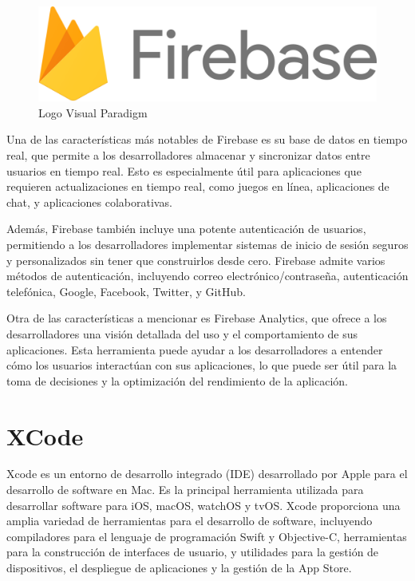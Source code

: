     \begin{figure}[H]
        \centering
        \includegraphics[width=.9\linewidth]{images/1280px-Firebase_Logo.svg.png}
        \caption{Logo Visual Paradigm}
        \label{fig:my_label}
    \end{figure}

    Una de las características más notables de Firebase es su base de datos en tiempo real, que permite a los desarrolladores almacenar y sincronizar datos entre usuarios en tiempo real. Esto es especialmente útil para aplicaciones que requieren actualizaciones en tiempo real, como juegos en línea, aplicaciones de chat, y aplicaciones colaborativas.

    Además, Firebase también incluye una potente autenticación de usuarios, permitiendo a los desarrolladores implementar sistemas de inicio de sesión seguros y personalizados sin tener que construirlos desde cero. Firebase admite varios métodos de autenticación, incluyendo correo electrónico/contraseña, autenticación telefónica, Google, Facebook, Twitter, y GitHub.

    Otra de las características a mencionar es Firebase Analytics, que ofrece a los desarrolladores una visión detallada del uso y el comportamiento de sus aplicaciones. Esta herramienta puede ayudar a los desarrolladores a entender cómo los usuarios interactúan con sus aplicaciones, lo que puede ser útil para la toma de decisiones y la optimización del rendimiento de la aplicación.
    
    \section{XCode}

    Xcode es un entorno de desarrollo integrado (IDE) desarrollado por Apple para el desarrollo de software en Mac. Es la principal herramienta utilizada para desarrollar software para iOS, macOS, watchOS y tvOS. Xcode proporciona una amplia variedad de herramientas para el desarrollo de software, incluyendo compiladores para el lenguaje de programación Swift y Objective-C, herramientas para la construcción de interfaces de usuario, y utilidades para la gestión de dispositivos, el despliegue de aplicaciones y la gestión de la App Store.

